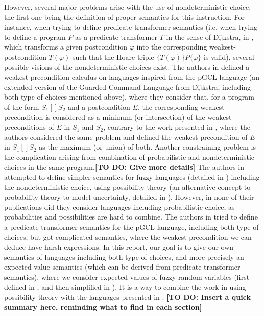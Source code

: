 \documentclass[a4paper,10pt]{llncs}
\newcommand\todo[1]{{\color{red}\textbf{[TO DO:  #1]}}}
\begin{document}
However, several major problems arise with the use of nondeterministic choice, the first one being the definition of proper semantics for this instruction. For instance, when trying to define predicate transformer semantics (i.e. when trying to define a program $P$ as a predicate transformer $T$ in the sense of Dijkstra, in \cite{Dijkstra76}, which transforms a given postcondition $\varphi$ into the corresponding weakest-postcondition $T(\varphi)$ such that the Hoare triple $\{T(\varphi)\}P\{\varphi\}$ is valid), several possible visions of the nondeterministic choices exist. The authors in \cite{McIver05,WuChen11} defined a weakest-precondition calculus on languages inspired from the pGCL language (an extended version of the Guarded Command Language from Dijkstra, including both type of choices mentioned above), where they consider that, for a program of the form $S_1 [\!] S_2$ and a postcondition $E$, the corresponding weakest precondition is considered as a minimum (or intersection) of the weakest preconditions of $E$ in $S_1$ and $S_2$, contrary to the work presented in \cite{WuChen08,WuChen12}, where the authors considered the same problem and defined the weakest precondition of $E$ in $S_1 [\!] S_2$ as the maximum (or union) of both.\newline
Another constraining problem is the complication arising from combination of probabilistic and nondeterministic choices in the same program.\todo{Give more details}\newline
The authors in \cite{WuChen08,WuChen11,WuChen12} attempted to define simpler semantics for fuzzy languages (detailed in \cite{Bueno93,Bueno97}) including the nondeterministic choice, using possibility theory (an alternative concept to probability theory to model uncertainty, detailed in \cite{Agarwal15,Shapiro09}). However, in none of their publications did they consider languages including probabilistic choice, as probabilities and possibilities are hard to combine. The authors in \cite{McIver05} tried to define a predicate transformer semantics for the pGCL language, including both type of choices, but got complicated semantics, where the weakest precondition we can deduce have harsh expressions.\newline
In this report, our goal is to give our own semantics of languages including both type of choices, and more precisely an expected value semantics (which can be derived from predicate transformer semantics), where we consider expected values of fuzzy random variables (first defined in \cite{PuriRal86}, and then simplified in \cite{Shapiro09}). It is a way to combine the work in \cite{WuChen08,WuChen11,WuChen12} using possibility theory with the languages presented in \cite{McIver05}.\newline
\todo{Insert a quick summary here, reminding what to find in each section}
\end{document}
